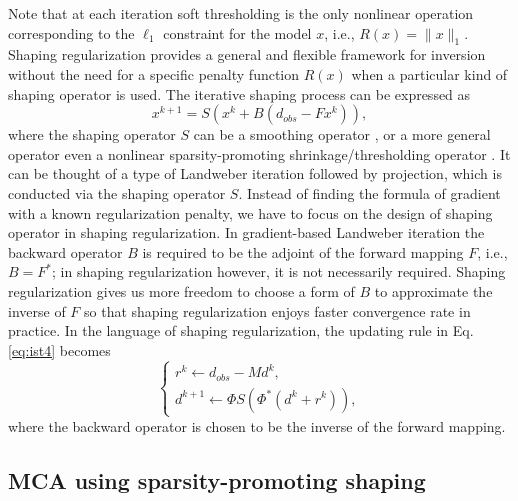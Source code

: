 Note that at each iteration soft thresholding is the only nonlinear operation corresponding to the $\ell_1$ constraint for the model $x$, i.e., $R(x)=\|x\|_1$.
 Shaping regularization \citep{fomel2007shaping,fomel2008nonlinear} provides a general and flexible framework for inversion without the need for a specific penalty function $R(x)$ when a particular kind of shaping operator is used. The iterative shaping process can be expressed as
 \begin{equation}\label{eq:shaping1}
   x^{k+1}=S(x^{k}+B(d_{obs}-Fx^{k})),
 \end{equation}
where the shaping operator $S$ can be a smoothing operator \citep{fomel2007shaping}, or a more general operator even  a nonlinear sparsity-promoting shrinkage/thresholding operator \citep{fomel2008nonlinear}. It can be thought of a type of Landweber iteration followed by projection, which is conducted via the shaping operator $S$. Instead of finding the formula of gradient with a known  regularization penalty, we have to focus on the design of shaping operator in shaping regularization. In gradient-based Landweber iteration the backward operator $B$ is required to be the adjoint of the forward mapping $F$, i.e., $B=F^*$; in shaping regularization however, it is not necessarily required. Shaping regularization gives us more freedom to choose a form of $B$ to approximate the inverse of $F$ so that shaping regularization enjoys faster convergence rate in practice. In the language of shaping regularization, the updating rule in Eq. \eqref{eq:ist4} becomes
\begin{equation}\label{eq:shaping2}
  \left\{
  \begin{array}{l}
    r^{k}\leftarrow d_{obs}-Md^{k}, \\
    d^{k+1}\leftarrow \Phi S(\Phi^{*}(d^{k}+r^{k})),
  \end{array}
  \right.
\end{equation}
where the backward operator is chosen to be the inverse of the forward mapping.

 
\subsection{MCA using sparsity-promoting shaping}

